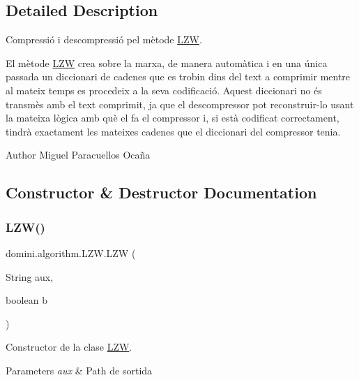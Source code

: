 \subsection{Detailed Description}
Compressió i descompressió pel mètode \hyperlink{classdomini_1_1algorithm_1_1LZW}{L\+ZW}. 

El mètode \hyperlink{classdomini_1_1algorithm_1_1LZW}{L\+ZW} crea sobre la marxa, de manera automàtica i en una única passada un diccionari de cadenes que es trobin dins del text a comprimir mentre al mateix temps es procedeix a la seva codificació. Aquest diccionari no és transmès amb el text comprimit, ja que el descompressor pot reconstruir-\/lo usant la mateixa lògica amb què el fa el compressor i, si està codificat correctament, tindrà exactament les mateixes cadenes que el diccionari del compressor tenia. \begin{DoxyAuthor}{Author}
Miguel Paracuellos Ocaña 
\end{DoxyAuthor}


\subsection{Constructor \& Destructor Documentation}
\mbox{\label{classdomini_1_1algorithm_1_1LZW_a00bd43f0691ac9679e6232b701e535ec}} 
\subsubsection{\texorpdfstring{L\+Z\+W()}{LZW()}}
{\footnotesize\ttfamily domini.\+algorithm.\+L\+Z\+W.\+L\+ZW (\begin{DoxyParamCaption}\item[{String}]{aux,  }\item[{boolean}]{b }\end{DoxyParamCaption})\hspace{0.3cm}{\ttfamily [inline]}}



Constructor de la clase \hyperlink{classdomini_1_1algorithm_1_1LZW}{L\+ZW}. 


\begin{DoxyParams}{Parameters}
{\em aux} & Path de sortida \\
\hline
\end{DoxyParams}


